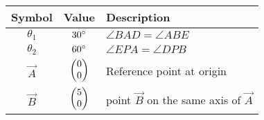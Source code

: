 \begin{tabular}{|c|c|p{5cm}|}
\hline
\textbf{Symbol} & \textbf{Value} & \textbf{Description} \\
\hline
$\theta_1$ & $30\degree$ & $\angle{BAD} = \angle{ABE}$ \\
\hline
$\theta_2$ & $60\degree$ & $\angle{EPA} = \angle{DPB}$ \\
\hline
	$\vec{A}$ & $\begin{pmatrix}0\\0\end{pmatrix}$ & Reference point at origin \\
\hline
	$\vec{B}$ & $\begin{pmatrix}5\\0\end{pmatrix}$ & point $\vec{B}$ on the same axis of $\vec{A}$ \\
\hline

\end{tabular}
